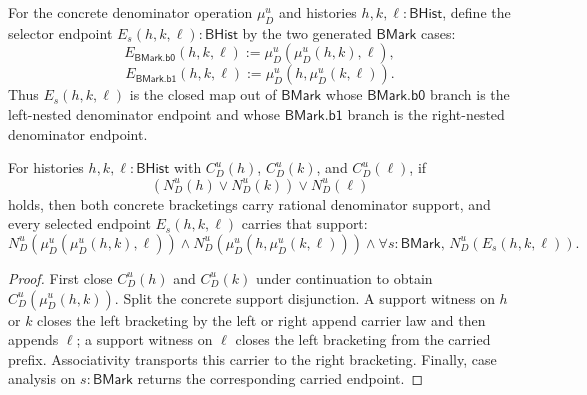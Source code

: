 \begin{definition}
\label{def:ratup-fieldup-bracketing-endpoint-selector}
For the concrete denominator operation $\mu_D^u$ and histories
$h,k,\ell:\mathsf{BHist}$, define the selector endpoint
$E_s(h,k,\ell):\mathsf{BHist}$ by the two generated $\mathsf{BMark}$ cases:
$$
E_{\mathsf{BMark.b0}}(h,k,\ell):=\mu_D^u(\mu_D^u(h,k),\ell),
$$
$$
E_{\mathsf{BMark.b1}}(h,k,\ell):=\mu_D^u(h,\mu_D^u(k,\ell)).
$$
Thus $E_s(h,k,\ell)$ is the closed map out of $\mathsf{BMark}$ whose
$\mathsf{BMark.b0}$ branch is the left-nested denominator endpoint and whose
$\mathsf{BMark.b1}$ branch is the right-nested denominator endpoint.
\end{definition}

\begin{theorem}
\label{thm:ratup-fieldup-bracketing-endpoint-selector-carrier-coverage}
For histories $h,k,\ell:\mathsf{BHist}$ with $C_D^u(h)$, $C_D^u(k)$, and
$C_D^u(\ell)$, if
$$
(N_D^u(h)\vee N_D^u(k))\vee N_D^u(\ell)
$$
holds, then both concrete bracketings carry rational denominator support, and
every selected endpoint $E_s(h,k,\ell)$ carries that support:
$$
N_D^u(\mu_D^u(\mu_D^u(h,k),\ell))
\wedge N_D^u(\mu_D^u(h,\mu_D^u(k,\ell)))
\wedge \forall s:\mathsf{BMark},\, N_D^u(E_s(h,k,\ell)).
$$
\end{theorem}
\begin{proof}
First close $C_D^u(h)$ and $C_D^u(k)$ under continuation to obtain
$C_D^u(\mu_D^u(h,k))$. Split the concrete support disjunction. A support
witness on $h$ or $k$ closes the left bracketing by the left or right append
carrier law and then appends $\ell$; a support witness on $\ell$ closes the
left bracketing from the carried prefix. Associativity transports this carrier
to the right bracketing. Finally, case analysis on $s:\mathsf{BMark}$ returns
the corresponding carried endpoint.
\end{proof}


